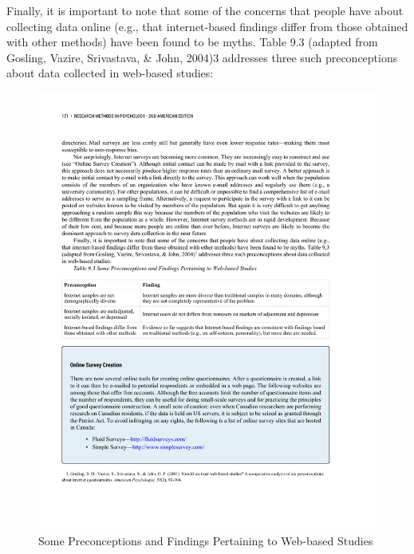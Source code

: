 Finally, it is important to note that some of the concerns that people have about collecting data online (e.g., that internet-based findings differ from those obtained with other methods) have been found to be myths. Table 9.3 (adapted from Gosling, Vazire, Srivastava, \& John, 2004)3 addresses three such preconceptions about data collected in web-based studies:




\begin{figure}




\includegraphics[width=\linewidth]{figures/C9online.pdf}




\caption{Some Preconceptions and Findings Pertaining to Web-based Studies
  }




\label{fig:online}




\end{figure}

